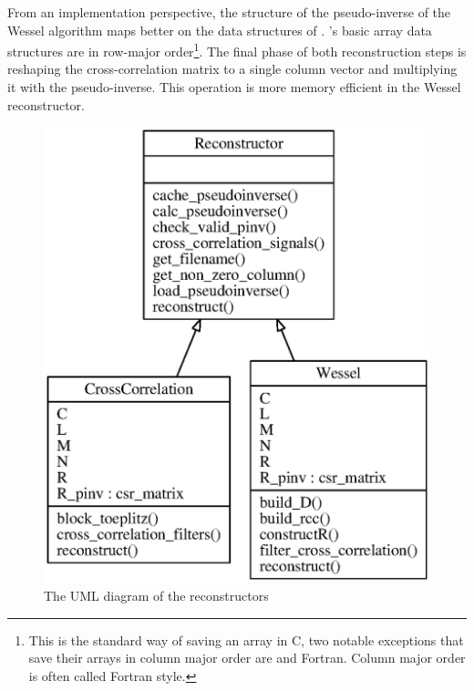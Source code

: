 \documentclass[a4paper, openany, oneside]{memoir}
\begin{document}
From an implementation perspective, the structure of the pseudo-inverse of the Wessel algorithm maps better on the data structures of . 's basic array data structures are in row-major order\footnote{This is the standard way of saving an array in C, two notable exceptions that save their arrays in column major order are \matlab{} and Fortran. Column major order is often called Fortran style.}. The final phase of both reconstruction steps is reshaping the cross-correlation matrix to a single column vector and multiplying it with the pseudo-inverse. This operation is more memory efficient in the Wessel reconstructor.



\begin{figure}
    \centering
    \includegraphics[width=0.5\linewidth]{./figures/classes_reconstruction.eps}
    \caption{The UML diagram of the reconstructors}
    \label{fig:umlreconstructor}
\end{figure}
\end{document}
